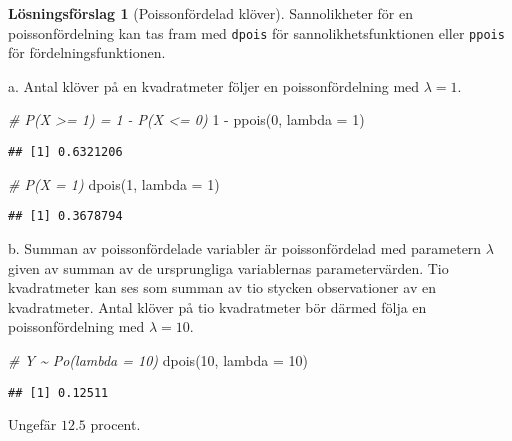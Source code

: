 \documentclass[
]{book}
\newenvironment{Shaded}{\begin{snugshade}}{\end{snugshade}}
\newcommand{\AttributeTok}[1]{\textcolor[rgb]{0.77,0.63,0.00}{#1}}
\newcommand{\CommentTok}[1]{\textcolor[rgb]{0.56,0.35,0.01}{\textit{#1}}}
\newcommand{\DecValTok}[1]{\textcolor[rgb]{0.00,0.00,0.81}{#1}}
\newcommand{\FunctionTok}[1]{\textcolor[rgb]{0.00,0.00,0.00}{#1}}
\newcommand{\NormalTok}[1]{#1}
\newcommand{\SpecialCharTok}[1]{\textcolor[rgb]{0.00,0.00,0.00}{#1}}
\theoremstyle{definition}
\theoremstyle{definition}
\theoremstyle{definition}
\theoremstyle{definition}
\newtheorem{hypothesis}{Lösningsförslag}[chapter]
\theoremstyle{remark}
\begin{document}
\begin{hypothesis}[Poissonfördelad klöver]
Sannolikheter för en poissonfördelning kan tas fram med \texttt{dpois} för sannolikhetsfunktionen eller \texttt{ppois} för fördelningsfunktionen.

a. Antal klöver på en kvadratmeter följer en poissonfördelning med \(\lambda = 1\).

\begin{Shaded}
\begin{Highlighting}[]
\CommentTok{\# P(X \textgreater{}= 1) = 1 {-} P(X \textless{}= 0)}
\DecValTok{1} \SpecialCharTok{{-}} \FunctionTok{ppois}\NormalTok{(}\DecValTok{0}\NormalTok{, }\AttributeTok{lambda =} \DecValTok{1}\NormalTok{)}
\end{Highlighting}
\end{Shaded}

\begin{verbatim}
## [1] 0.6321206
\end{verbatim}

\begin{Shaded}
\begin{Highlighting}[]
\CommentTok{\# P(X = 1)}
\FunctionTok{dpois}\NormalTok{(}\DecValTok{1}\NormalTok{, }\AttributeTok{lambda =} \DecValTok{1}\NormalTok{)}
\end{Highlighting}
\end{Shaded}

\begin{verbatim}
## [1] 0.3678794
\end{verbatim}

b. Summan av poissonfördelade variabler är poissonfördelad med parametern \(\lambda\) given av summan av de ursprungliga variablernas parametervärden. Tio kvadratmeter kan ses som summan av tio stycken observationer av en kvadratmeter. Antal klöver på tio kvadratmeter bör därmed följa en poissonfördelning med \(\lambda = 10\).

\begin{Shaded}
\begin{Highlighting}[]
\CommentTok{\# Y \textasciitilde{} Po(lambda = 10)}
\FunctionTok{dpois}\NormalTok{(}\DecValTok{10}\NormalTok{, }\AttributeTok{lambda =} \DecValTok{10}\NormalTok{)}
\end{Highlighting}
\end{Shaded}

\begin{verbatim}
## [1] 0.12511
\end{verbatim}

Ungefär \(12.5\) procent.
\end{hypothesis}
\end{document}
